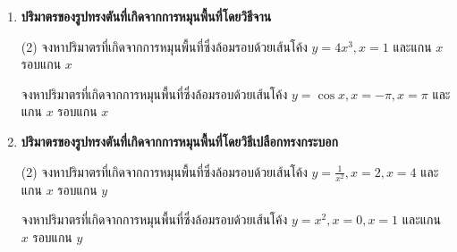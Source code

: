 \begin{enumerate}
\[ \rule{200pt}{1pt} \]

จงหาพื้นที่ระหว่างเส้นโค้งต่อไปนี้ ในทิศทางของแกน $y$ พร้อมวาดกราฟโดยคร่าว

\begin{tasks}[after-skip=80pt, after-item-skip = 80pt](2)
\task เส้นโค้ง $x = 2-2y$, แกน $y$ และเส้นตรง $y = 6$

\hfill
{}

\task เส้นโค้ง $x = y^2$, เส้นตรง $x=4$ ระหว่าง $y=-2$ และ $y=2$

\hfill
{}

\end{tasks}
\item \textbf{ปริมาตรของรูปทรงตันที่เกิดจากการหมุนพื้นที่โดยวิธีจาน}

\begin{tasks}[after-skip=120pt, after-item-skip = 120pt](2)
\task จงหาปริมาตรที่เกิดจากการหมุนพื้นที่ซึ่งล้อมรอบด้วยเส้นโค้ง $y=4x^3, x=1$ และแกน $x$ รอบแกน $x$

\task จงหาปริมาตรที่เกิดจากการหมุนพื้นที่ซึ่งล้อมรอบด้วยเส้นโค้ง $y=\cos x, x=-\pi, x=\pi$ และแกน $x$ รอบแกน $x$
\end{tasks}

\item \textbf{ปริมาตรของรูปทรงตันที่เกิดจากการหมุนพื้นที่โดยวิธีเปลือกทรงกระบอก}

\begin{tasks}[after-skip=100pt, after-item-skip = 100pt](2)
\task จงหาปริมาตรที่เกิดจากการหมุนพื้นที่ซึ่งล้อมรอบด้วยเส้นโค้ง $y=\frac{1}{x^2}, x = 2, x=4$ และแกน $x$ รอบแกน $y$

\task จงหาปริมาตรที่เกิดจากการหมุนพื้นที่ซึ่งล้อมรอบด้วยเส้นโค้ง $y=x^2, x=0, x=1$ และแกน $x$ รอบแกน $y$
\end{tasks}

\end{enumerate}